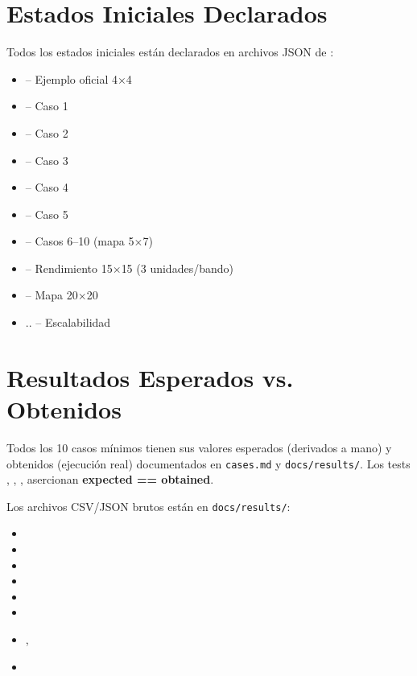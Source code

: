 \section{Estados Iniciales Declarados}
\label{sec:estados-iniciales}

Todos los estados iniciales están declarados en archivos JSON de :

\begin{itemize}
\item {} -- Ejemplo oficial 4$\times$4
\item {} -- Caso 1
\item {} -- Caso 2
\item {} -- Caso 3
\item {} -- Caso 4
\item {} -- Caso 5
\item {} -- Casos 6--10 (mapa 5$\times$7)
\item {} -- Rendimiento 15$\times$15 (3 unidades/bando)
\item {} -- Mapa 20$\times$20
\item {} ..  -- Escalabilidad
\end{itemize}

\section{Resultados Esperados vs. Obtenidos}
\label{sec:esperado-vs-obtenido}

Todos los 10 casos mínimos tienen sus valores esperados (derivados a mano) y obtenidos
(ejecución real) documentados en \texttt{cases.md} y \texttt{docs/results/}.
Los tests , , ,
 asercionan \textbf{expected == obtained}.

Los archivos CSV/JSON brutos están en \texttt{docs/results/}:

\begin{itemize}
\item {}
\item {}
\item {}
\item {}
\item {}
\item {}
\item {}, 
\item {}
\end{itemize}

